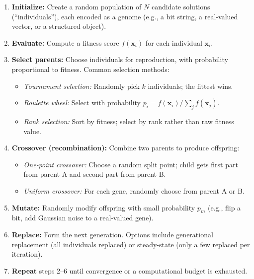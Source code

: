 \begin{enumerate}[leftmargin=1.5em]
  \item \textbf{Initialize:} Create a random population of $N$ candidate solutions (``individuals''), each encoded as a genome (e.g., a bit string, a real-valued vector, or a structured object).

  \item \textbf{Evaluate:} Compute a fitness score $f(\mathbf{x}_i)$ for each individual $\mathbf{x}_i$.

  \item \textbf{Select parents:} Choose individuals for reproduction, with probability proportional to fitness. Common selection methods:
  \begin{itemize}[leftmargin=1.5em]
    \item \emph{Tournament selection:} Randomly pick $k$ individuals; the fittest wins.
    \item \emph{Roulette wheel:} Select with probability $p_i = f(\mathbf{x}_i) / \sum_j f(\mathbf{x}_j)$.
    \item \emph{Rank selection:} Sort by fitness; select by rank rather than raw fitness value.
  \end{itemize}

  \item \textbf{Crossover (recombination):} Combine two parents to produce offspring:
  \begin{itemize}[leftmargin=1.5em]
    \item \emph{One-point crossover:} Choose a random split point; child gets first part from parent A and second part from parent B.
    \item \emph{Uniform crossover:} For each gene, randomly choose from parent A or B.
  \end{itemize}

  \item \textbf{Mutate:} Randomly modify offspring with small probability $p_m$ (e.g., flip a bit, add Gaussian noise to a real-valued gene).

  \item \textbf{Replace:} Form the next generation. Options include generational replacement (all individuals replaced) or steady-state (only a few replaced per iteration).

  \item \textbf{Repeat} steps 2--6 until convergence or a computational budget is exhausted.
\end{enumerate}

